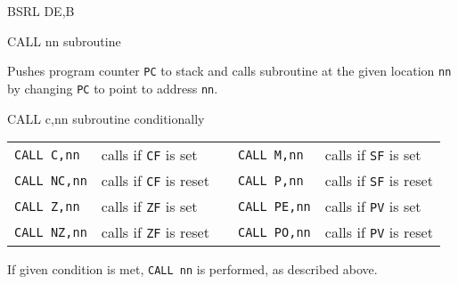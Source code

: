 \documentclass[12pt,twoside,openright,a4paper]{book}
\begin{document}
\begin{basedescript}{
	\desclabelstyle{\multilinelabel}
	\desclabelwidth{3cm}}
\begin{DetailItem}{BSRL DE,B\ZXN}
	\end{DetailItem}
	
	\pagebreak
	\begin{DetailItem}{CALL nn}
		{ subroutine}
		{}

		Pushes program counter {\tt PC} to stack and calls subroutine at the given location {\tt nn} by changing {\tt PC} to point to address {\tt nn}.

		\begin{DetailEffects}
			\FlagsCALLnn
		\end{DetailEffects}
		
		\begin{DetailTiming}
			\DetailTime{5}{17}
		\end{DetailTiming}

	\end{DetailItem}

	\begin{DetailItem}{CALL c,nn}
		{ subroutine conditionally}
		{\SymCALLc{nn}}

		\vspace{1ex} %
		\begin{tabular}{@{}llcll}			
			{\tt CALL C,nn} & calls if {\tt CF} is set & &
				{\tt CALL M,nn} & calls if {\tt SF} is set\\
			{\tt CALL NC,nn} & calls if {\tt CF} is reset & &
				{\tt CALL P,nn} & calls if {\tt SF} is reset\\
			{\tt CALL Z,nn} & calls if {\tt ZF} is set & &
				{\tt CALL PE,nn} & calls if {\tt PV} is set\\
			{\tt CALL NZ,nn} & calls if {\tt ZF} is reset & &
				{\tt CALL PO,nn} & calls if {\tt PV} is reset\\
		\end{tabular}

		If given condition is met, {\tt CALL nn} is performed, as described above.

		\begin{DetailEffects}
			\FlagsCALLccnn
		\end{DetailEffects}

		\begin{DetailTiming}
			\DetailTime[c\normalfont{=false}]{3}{10}
			\DetailTime[c\normalfont{=true}]{5}{17}
		\end{DetailTiming}

	\end{DetailItem}


\end{basedescript}
\end{document}
